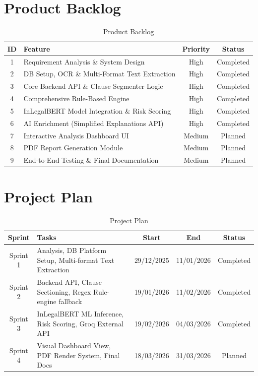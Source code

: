 \documentclass[a4paper,12pt]{report}
\begin{document}
\section{Product Backlog}

\begin{table}[H]
\centering
\caption{Product Backlog}
\vspace{8pt}
\label{tab:backlog}
\renewcommand{\arraystretch}{1.3}
\begin{tabular}{|c|l|c|c|}
\hline
\textbf{ID} & \textbf{Feature} & \textbf{Priority} & \textbf{Status} \\
\hline
1 & Requirement Analysis \& System Design & High & Completed \\
2 & DB Setup, OCR \& Multi-Format Text Extraction & High & Completed \\
3 & Core Backend API \& Clause Segmenter Logic & High & Completed \\
4 & Comprehensive Rule-Based Engine & High & Completed \\
5 & InLegalBERT Model Integration \& Risk Scoring & High & Completed \\
6 & AI Enrichment (Simplified Explanations API) & High & Completed \\
7 & Interactive Analysis Dashboard UI & Medium & Planned \\
8 & PDF Report Generation Module & Medium & Planned \\
9 & End-to-End Testing \& Final Documentation & Medium & Planned \\
\hline
\end{tabular}
\end{table}

\section{Project Plan}

\begin{table}[H]
\centering
\caption{Project Plan}
\vspace{8pt}
\label{tab:projectplan}
\renewcommand{\arraystretch}{1.3}
\begin{tabular}{|c|p{6cm}|c|c|c|}
\hline
\textbf{Sprint} & \textbf{Tasks} & \textbf{Start} & \textbf{End} & \textbf{Status} \\
\hline
Sprint 1 & Analysis, DB Platform Setup, Multi-format Text Extraction & 29/12/2025 & 11/01/2026 & Completed \\
Sprint 2 & Backend API, Clause Sectioning, Regex Rule-engine fallback & 19/01/2026 & 11/02/2026 & Completed \\
Sprint 3 & InLegalBERT ML Inference, Risk Scoring, Groq External API & 19/02/2026 & 04/03/2026 & Completed \\
Sprint 4 & Visual Dashboard View, PDF Render System, Final Docs & 18/03/2026 & 31/03/2026 & Planned \\
\hline
\end{tabular}
\end{table}
\end{document}
